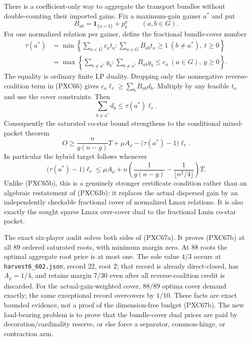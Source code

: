 \documentclass[11pt]{article}
\begin{document}
There is a coefficient-only way to aggregate the transport bundles without
double-counting their imported gains.  Fix a maximum-gain gainer $a^*$ and
put
\[
 B_{ab}=\mathbf1_{\{a=b\}}+p^a_b\qquad(a,b\in G).
\]
For one normalized relation per gainer, define the fractional bundle-cover
number
\[
 \begin{aligned}
 \tau(a^*)&=\min\left\{\sum_{a\in G}c_at_a:
       \sum_{a\in G}B_{ab}t_a\ge1\ (b\ne a^*),\ t\ge0\right\} \\[-2pt]
 &=\max\left\{\sum_{b\ne a^*}y_b:
       \sum_{b\ne a^*}B_{ab}y_b\le c_a\ (a\in G),\ y\ge0\right\}.
 \end{aligned}                                                  \tag{PXC67a}
\]
The equality is ordinary finite LP duality.  Dropping only the nonnegative
reverse-coalition term in (PXC66) gives
$c_a\ell_r\ge\sum_bB_{ab}d_b$.  Multiply by any feasible $t_a$ and use the
cover constraints.  Then
\[
 \sum_{b\ne a^*}d_b\le\tau(a^*)\ell_r.
\]
Consequently the saturated co-star bound strengthens to the conditional
mixed-packet theorem
\[
 \boxed{\qquad
 O\ge \frac{n}{g(n-g)}T+\mu A_\rho-
       \bigl(\tau(a^*)-1\bigr)\ell_r.
 \qquad}                                             \tag{PXC67}
\]
In particular the hybrid target follows whenever
\[
 \bigl(\tau(a^*)-1\bigr)\ell_r\le \mu A_\rho+
 n\left(\frac1{g(n-g)}-\frac1{\lfloor n^2/4\rfloor}\right)T.
                                                               \tag{PXC67b}
\]
Unlike (PXC65b), this is a genuinely stronger certificate condition rather
than an algebraic restatement of (PXC63b): it replaces the actual dispersed
gain by an independently checkable fractional cover of normalized Lmax
relations.  It is also exactly the sought sparse Lmax over-cover dual to the
fractional Lmin co-star packet.

The exact six-player audit solves both sides of (PXC67a).  It proves
(PXC67b) at all $89$ ordered saturated roots, with minimum margin zero.
At $88$ roots the optimal aggregate root price is at most one.  The sole
value $4/3$ occurs at
\texttt{harvest6\_602.json}, record $22$, root $2$; that record is already
direct-closed, has $A_\rho=1/4$, and retains margin $7/30$ even after all
reverse-coalition credit is discarded.  For the actual-gain-weighted cover,
$88/89$ optima cover demand exactly; the same exceptional record overcovers
by $1/10$.  These facts are exact bounded evidence, not a proof of the
dimension-free budget (PXC67b).  The new load-bearing problem is to prove
that the bundle-cover dual prices are paid by decoration/cardinality reserve,
or else force a separator, common-hinge, or contraction arm.
\end{document}
